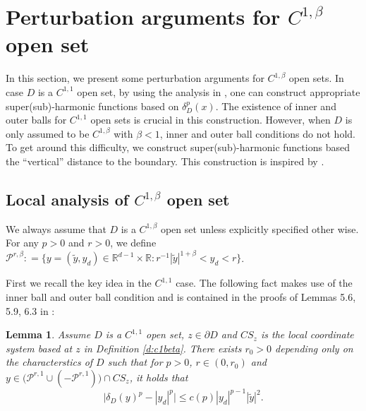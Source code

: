 \documentclass[12pt,a4paper]{amsart}
\numberwithin{equation}{section}
\theoremstyle{plain}
\newcommand{\be}{\beta}
\newcommand{\1}{\mathbbm{1}}
\newtheorem{lemma}[theorem]{Lemma}
\begin{document}
\section{Perturbation arguments for $C^{1,\beta}$ open set}

In this section, we present some perturbation arguments for $C^{1,\be}$ open sets. 
In case $D$ is a $C^{1,1}$ open set, by using the analysis in \cite{BBC03}, one can construct appropriate super(sub)-harmonic functions based on $\delta_D^p(x)$.
The existence of inner and outer balls for $C^{1,1}$ open sets is crucial in this construction.
However, when $D$ is only assumed to be $C^{1,\be}$ with $\be<1$, 
inner and outer ball conditions do not hold. To get around this difficulty, we construct super(sub)-harmonic functions 
based the ``vertical'' distance to the boundary. 
This construction is inspired by \cite{Guan07}.

\subsection{Local analysis of $C^{1,\beta}$ open set}
We always assume that $D$ is a $C^{1, \beta}$ open set unless explicitly specified other wise. For any $p>0$ and $r>0$, we define
$\mathcal{P}^{r,\beta}: = \{y= (\widetilde{y},y_d) \in \mathbb{R}^{d-1} \times \mathbb{R}: r^{-1} |\widetilde{y}|^{1+\beta} < y_d < r\}$.

First we recall the key idea in the $C^{1,1}$ case. The following fact makes use of the inner ball and outer ball condition and is contained in the proofs of Lemmas 5.6, 5.9, 6.3 in \cite{BBC03}:
\begin{lemma}\label{C11 case}
Assume $D$ is a $C^{1,1}$ open set, $z \in \partial D$ and $CS_z$ is the local coordinate system based at $z$ in Definition
\ref{d:c1beta}. 
There exists $r_0>0$ depending only on the characterstics of $D$ such that for $p>0$, $r\in (0, r_0)$ and $y \in \big(\mathcal{P}^{r,1} \cup (- \mathcal{P}^{r,1}) \big)\cap CS_z$,  it holds that
\begin{equation} \label{difference of distances: C11}
\big| \delta_D(y)^p - |y_d|^p \big| \le c(p) |y_d|^{p-1}|\widetilde{y}|^2.
\end{equation}
\end{lemma}
\end{document}
